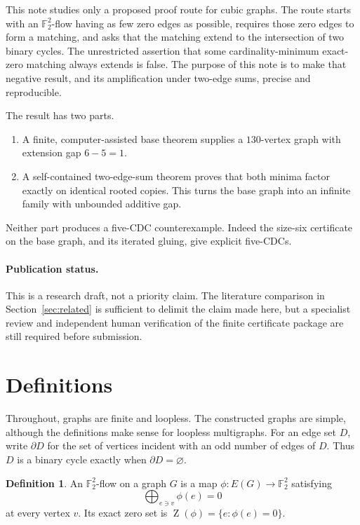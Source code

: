 \documentclass[11pt]{article}
\theoremstyle{definition}
\newtheorem{definition}[theorem]{Definition}
\newcommand{\F}{\mathbb F}
\newcommand{\Zer}{\operatorname{Z}}
\begin{document}
This note studies only a proposed proof route for cubic graphs.  The route
starts with an \(\F_2^2\)-flow having as few zero edges as possible,
requires those zero edges to form a matching, and asks that the matching
extend to the intersection of two binary cycles.  The unrestricted
assertion that some cardinality-minimum exact-zero matching always extends
is false.  The purpose of this note is to make that negative result, and
its amplification under two-edge sums, precise and reproducible.

The result has two parts.
\begin{enumerate}
\item A finite, computer-assisted base theorem supplies a \(130\)-vertex
graph with extension gap \(6-5=1\).
\item A self-contained two-edge-sum theorem proves that both minima
factor exactly on identical rooted copies.  This turns the base graph into
an infinite family with unbounded additive gap.
\end{enumerate}
Neither part produces a five-CDC counterexample.  Indeed the size-six
certificate on the base graph, and its iterated gluing, give explicit
five-CDCs.

\paragraph{Publication status.}
This is a research draft, not a priority claim.  The literature comparison
in Section~\ref{sec:related} is sufficient to delimit the claim made here,
but a specialist review and independent human verification of the finite
certificate package are still required before submission.

\section{Definitions}

Throughout, graphs are finite and loopless.  The constructed graphs are
simple, although the definitions make sense for loopless multigraphs.
For an edge set \(D\), write \(\partial D\) for the set of vertices
incident with an odd number of edges of \(D\).  Thus \(D\) is a binary
cycle exactly when \(\partial D=\varnothing\).

\begin{definition}
An \(\F_2^2\)-flow on a graph \(G\) is a map
\(\phi:E(G)\to\F_2^2\) satisfying
\[
 \bigoplus_{e\ni v}\phi(e)=0
\]
at every vertex \(v\).  Its exact zero set is
\(\Zer(\phi)=\{e:\phi(e)=0\}\).
\end{definition}
\end{document}
